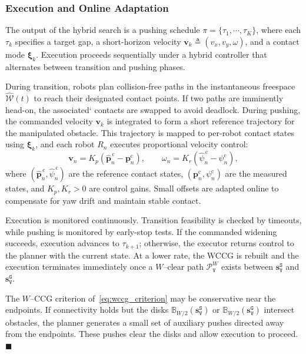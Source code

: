 \subsubsection{Execution and Online Adaptation}\label{subsec:execute}
The output of the hybrid search is a pushing schedule
$\pi=\{\tau_1,\cdots,\tau_K\}$, where each $\tau_k$ specifies a target gap, a
short-horizon velocity $\mathbf{v}_k\triangleq(v_x,v_y,\omega)$, and a contact
mode $\boldsymbol{\xi}_k$. Execution proceeds sequentially under a hybrid
controller that alternates between transition and pushing phases.

During transition, robots plan collision-free paths in the
instantaneous freespace $\widehat{\mathcal{W}}(t)$ to reach their designated
contact points. If two paths are imminently head-on, the associated`
contacts are swapped to avoid deadlock.
During pushing, the commanded velocity $\mathbf{v}_k$ is integrated to form a
short reference trajectory for the manipulated obstacle. This trajectory is
mapped to per-robot contact states using $\boldsymbol{\xi}_k$, and each robot
$R_n$ executes proportional velocity control:
\[
\mathbf{v}_n = K_{\!p}\!\left(\widehat{\mathbf{p}}^{\,\text{c}}_n - \mathbf{p}^{\text{c}}_n\right),
\qquad
\omega_n = K_{\!r}\!\left(\widehat{\psi}^{\,\text{c}}_n - \psi^{\text{c}}_n\right),
\]
where $(\widehat{\mathbf{p}}^{\,\text{c}}_n,\widehat{\psi}^{\,\text{c}}_n)$ are
the reference contact states, $(\mathbf{p}^{\text{c}}_n,\psi^{\text{c}}_n)$ are
the measured states, and $K_{\!p},K_{\!r}>0$ are control gains. Small offsets
are adapted online to compensate for yaw drift and maintain stable contact.

Execution is monitored continuously. Transition feasibility is checked by
timeouts, while pushing is monitored by early-stop tests. If the commanded
widening succeeds, execution advances to $\tau_{k+1}$; otherwise, the
executor returns control to the planner with the current state. At a lower rate,
the WCCG is rebuilt and the execution terminates immediately once a
$W$--clear path $\mathcal{P}^W_\texttt{V}$ exists between
$\mathbf{s}_\texttt{V}^{\texttt{S}}$ and $\mathbf{s}_\texttt{V}^{\texttt{G}}$.

\begin{remark}
The $W$--CCG criterion of~\eqref{eq:wccg_criterion} may be conservative near
the endpoints. If connectivity holds but the disks
$\mathbb{B}_{W/2}(\mathbf{s}_\texttt{V}^{\texttt{S}})$ or
$\mathbb{B}_{W/2}(\mathbf{s}_\texttt{V}^{\texttt{G}})$ intersect obstacles, the
planner generates a small set of auxiliary pushes directed away from the
endpoints. These pushes clear the disks and allow execution to proceed.
\hfill$\blacksquare$
\end{remark}

